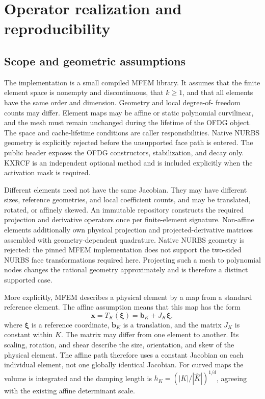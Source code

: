 \chapter{Operator realization and reproducibility}
\label{sec:ofdg-implementation}
\label{app:reproducibility}

\section{Scope and geometric assumptions}

The implementation is a small compiled MFEM library.  It assumes that the
finite element space is nonempty and discontinuous, that $k\geq 1$, and that
all elements have the same order and dimension.  Geometry and local degree-of-
freedom counts may differ.  Element maps may be affine or static polynomial curvilinear, and the mesh
must remain unchanged during the lifetime of the OFDG object.  The space and cache-lifetime conditions are caller responsibilities. Native NURBS geometry is explicitly rejected before the unsupported face path is entered.
The public header exposes the OFDG constructors, stabilization, and decay only.
KXRCF is an independent optional method and is included explicitly when the
activation mask is required.

Different elements need not have the same Jacobian.  They may have different
sizes, reference geometries, and local coefficient counts, and may be
translated, rotated, or affinely skewed.  An immutable repository constructs
the required projection and derivative operators once per finite-element
signature.  Non-affine elements additionally own physical projection and
projected-derivative matrices assembled with geometry-dependent quadrature.
Native NURBS geometry is rejected: the pinned MFEM implementation does not
support the two-sided NURBS face transformations required here.  Projecting such
a mesh to polynomial nodes changes the rational geometry approximately and is
therefore a distinct supported case.

More explicitly, MFEM describes a physical element by a map from a standard
reference element.  The affine assumption means that this map has the form
\begin{equation}
  \boldsymbol{x}=T_K(\boldsymbol{\xi})
  =\boldsymbol{b}_K+J_K\boldsymbol{\xi},
  \label{eq:ofdg-affine-map}
\end{equation}
where $\boldsymbol{\xi}$ is a reference coordinate, $\boldsymbol{b}_K$ is a
translation, and the matrix $J_K$ is constant within $K$.  The matrix may differ
from one element to another.  Its scaling, rotation, and shear describe the size,
orientation, and skew of the physical element.  The affine path therefore uses a constant Jacobian on each individual element,
not one globally identical Jacobian.  For curved maps the volume is integrated
and the damping length is $h_K=(|K|/|\widehat K|)^{1/d}$, agreeing with the
existing affine determinant scale.


